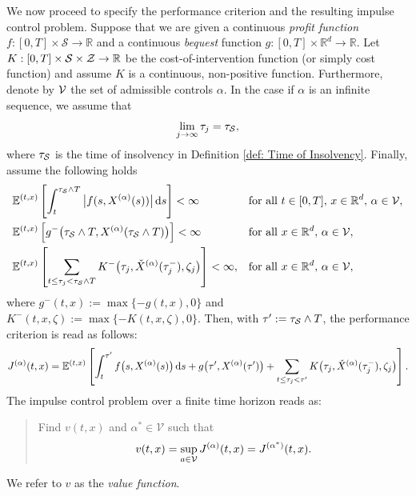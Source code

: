 We now proceed to specify the performance criterion and the resulting impulse control problem. Suppose that we are given a continuous \emph{profit function} $f: [0,T] \times \mathcal{S} \rightarrow \mathbb R$ and a continuous \emph{bequest} function $g: [0,T] \times \mathbb R^d \rightarrow \mathbb R$. Let $K: [0,T] \times \mathcal{S} \times \mathcal Z \rightarrow \mathbb{R}$ be the cost-of-intervention function (or simply cost function) and assume $K$ is a continuous, non-positive function. Furthermore, denote by $\mathcal{V}$ the set of admissible controls $\alpha$. In the case if $\alpha$ is an infinite sequence, we assume that
\begin{equation}
    \lim_{j \rightarrow \infty} \tau_j = \tau_{\mathcal{S}},
    \label{eqn: lim of tau_j}
\end{equation}
where $\tau_{\mathcal{S}}$ is the time of insolvency in Definition \ref{def: Time of Insolvency}. Finally, assume the following holds
\begin{align}
    & \mathbb{E}^{(t,x)}\left[\int_t^{\tau_{\mathcal{S}} \wedge T} \big| f(s,X^{(\alpha)}(s))\big| \,\mathrm{d} s \right] < \infty && \text{for all } t \in [0,T], \, x \in \mathbb{R}^d,\, \alpha \in \mathcal{V},
    \label{eqn: well-behavedness of f} \\
    & \mathbb{E}^{(t,x)}\left[ g^-\big(\tau_{\mathcal{S}} \wedge T, X^{(\alpha)} (\tau_{\mathcal{S}} \wedge T)\big) \right] < \infty && \text{for all } x \in \mathbb{R}^d, \, \alpha \in \mathcal{V}, 
    \label{eqn: well-behavedness of g} \\
    & \mathbb{E}^{(t,x)} \left[ \sum_{t \leq \tau_j < \tau_{\mathcal{S}} \wedge T} K^-\big(\tau_j,\check{X}^{(\alpha)}(\tau_j^-), \zeta_j\big) \right] < \infty, && \text{for all } x \in \mathbb{R}^d, \, \alpha \in \mathcal{V},
    \label{eqn: well-behavedness of K}
\end{align}
where $g^-(t,x) := \max\{-g(t,x), 0\}$ and $K^-(t,x,\zeta) := \max\{-K(t,x, \zeta), 0\}$. Then, with $\tau' := \tau_{\mathcal{S}} \wedge T$, the performance criterion is read as follows:
\begin{equation}
    J^{(\alpha)}(t,x) = \mathbb{E}^{(t,x)} \left[ \int_t^{\tau'} f\big(s,X^{(\alpha)}(s)\big) \,\mathrm{d} s + g\big(\tau', X^{(\alpha)}(\tau')\big) + \sum_{t \leq \tau_j < \tau'} K\big(\tau_j, \check{X}^{(\alpha)}(\tau_j^-), \zeta_j\big) \right].
    \label{eqn: performance criterion}
\end{equation}
The impulse control problem over a finite time horizon reads as:
\begin{quote}
    Find $v(t,x)$ and $\alpha^* \in \mathcal V$ such that 
    \begin{equation}
        v(t,x) = \sup_{a \in \mathcal{V}}J^{(\alpha)}(t,x) = J^{(\alpha^*)}(t,x).
        \label{eqn: optimal value function}
    \end{equation}
\end{quote}
We refer to $v$ as the \emph{value function}. 

